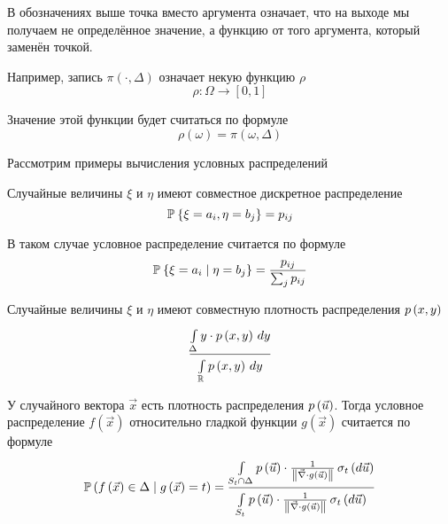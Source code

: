 \begin{remark}
    В обозначениях выше точка вместо аргумента означает,
    что на выходе мы получаем не определённое значение,
    а функцию от того аргумента, который заменён точкой.

    Например, запись $\pi\left( \cdot, \Delta \right)$
    означает некую функцию $\rho$
        $$\rho: \Omega \rightarrow \left[ 0, 1 \right]$$

    Значение этой функции будет считаться по формуле
        $$\rho\left( \omega \right) = \pi\left( \omega, \Delta \right)$$
\end{remark}

Рассмотрим примеры вычисления условных распределений

\begin{example}
    Случайные величины $\xi$ и $\eta$ имеют совместное дискретное распределение
    $$\Probability{\xi = a_i, \eta = b_j} = p_{ij}$$

    В таком случае условное распределение считается по формуле
    \begin{align*}
        \Probability{\xi = a_i \mcond \eta = b_j}
        = \frac{p_{ij}}{\sum_j p_{ij}}
    \end{align*}
\end{example}

\begin{example}
    Случайные величины $\xi$ и $\eta$ имеют
    совместную плотность распределения $\pdf{x,y}$
        $$\frac{\integral{\Delta}{}{y}{y \cdot \pdf{x,y}}}
            {\integral{\mathbb{R}}{}{y}{\pdf{x,y}}}$$
\end{example}

\begin{example}
    У случайного вектора $\vec{x}$ есть плотность распределения $\pdf{\vec{u}}$.
    Тогда условное распределение $f\left( \vec{x} \right)$ относительно
    гладкой функции $g\left( \vec{x} \right)$ считается по формуле
    $$\probability{f\left( \vec{x} \right) \in \Delta
        \mcond g\left( \vec{x} \right) = t}
        = \frac{\integrall{S_t \cap \Delta}{\sigma_{t}\left(d\vec{u} \right)}{
            \pdf{\vec{u}} \cdot \frac{1}{
                \left\| \vec{\nabla} \cdot g\left( \vec{u} \right) \right\|}}}
            {\integrall{S_t}{\sigma_{t}\left(d\vec{u} \right)}{
                \pdf{\vec{u}} \cdot \frac{1}{
                    \left\| \vec{\nabla}
                        \cdot g\left( \vec{u} \right) \right\|}}}$$
\end{example}

